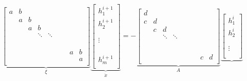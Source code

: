 \begin{equation}
\begin{aligned}
	   \underbrace{\begin{bmatrix}
	    	a & b \\
	    	  & a & b \\
	    	  &   & a & b  \\
	    	  &   &   & \ddots  & \ddots \\
	    	  &   &   &   &  &  \\
	    	  &   &   &   &  &  &  \\
	    	  &   &   &   &  &  &  &  \\
	    	  &   &   &   &  &  &  & a  &b\\
	    	  &   &   &   &  &  &  &  &  a\\
	   \end{bmatrix}}_{\xi}
	    \underbrace{\begin{bmatrix}
		h_{1}^{i+1} \\
		h_{2}^{i+1}\\
					\\
					\\
		\vdots		\\
					\\
					\\
					\\
		h_{m}^{i+1}\\
	\end{bmatrix}}_{\dot{x}}
	= -
	\underbrace{\begin{bmatrix}
	    	d &  \\
	    	c & d & \\
	    	  & c & d 		&   \\
	    	  &   &	\ddots   & \ddots  &  \\
	    	  &   &   &  	&  &  \\
	    	  &   &   &   &  &  &  \\
	    	  &   &   &   &  &  &  &  \\
	    	  &   &   &   &  &  &  &   &\\
	    	  &   &   &   &  &  &  & c &  d\\
	    \end{bmatrix}}_{A}
	    	\underbrace{\begin{bmatrix}
		h_{1}^{i} \\
		h_{2}^{i}\\
					\\
					\\
		\vdots		\\
					\\

\end{bmatrix}}
\end{aligned}
\end{equation}

